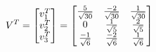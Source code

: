 \documentclass[preview]{standalone}
\begin{document}
\begin{align*}
\special{dvisvgm:raw <g id='unique000'>}V^T = \begin{bmatrix} v_1^T \\ v_2^T \\ v_3^T \end{bmatrix} = \begin{bmatrix} \frac{5}{\sqrt{30}} & \frac{-2}{\sqrt{30}} & \frac{1}{\sqrt{30}} \\ 0 & \frac{1}{\sqrt{5}} & \frac{2}{\sqrt{5}} \\ \frac{-1}{\sqrt{6}} & \frac{-2}{\sqrt{6}} & \frac{1}{\sqrt{6}} \end{bmatrix}\special{dvisvgm:raw </g>}
\end{align*}
\end{document}
